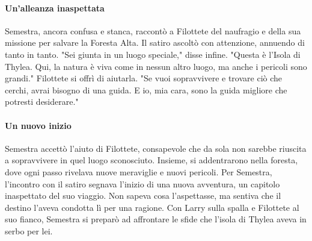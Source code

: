 \documentclass[letterpaper,twocolumn,openany,nodeprecatedcode]{dndbook}
\begin{document}
\paragraph{Un’alleanza inaspettata}  
Semestra, ancora confusa e stanca, raccontò a Filottete del naufragio e della sua missione per salvare la Foresta Alta. Il satiro ascoltò con attenzione, annuendo di tanto in tanto. "Sei giunta in un luogo speciale," disse infine. "Questa è l’Isola di Thylea. Qui, la natura è viva come in nessun altro luogo, ma anche i pericoli sono grandi." Filottete si offrì di aiutarla. "Se vuoi sopravvivere e trovare ciò che cerchi, avrai bisogno di una guida. E io, mia cara, sono la guida migliore che potresti desiderare."

\paragraph{Un nuovo inizio}  
Semestra accettò l’aiuto di Filottete, consapevole che da sola non sarebbe riuscita a sopravvivere in quel luogo sconosciuto. Insieme, si addentrarono nella foresta, dove ogni passo rivelava nuove meraviglie e nuovi pericoli. Per Semestra, l’incontro con il satiro segnava l’inizio di una nuova avventura, un capitolo inaspettato del suo viaggio. Non sapeva cosa l’aspettasse, ma sentiva che il destino l’aveva condotta lì per una ragione. Con Larry sulla spalla e Filottete al suo fianco, Semestra si preparò ad affrontare le sfide che l’isola di Thylea aveva in serbo per lei.
\end{document}
